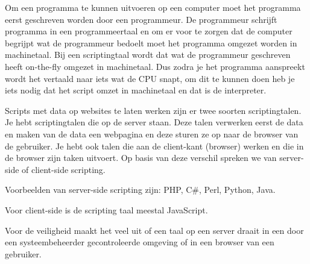 Om een programma te kunnen uitvoeren op een computer moet het programma eerst geschreven worden door een programmeur. De programmeur schrijft programma in een programmeertaal en om er voor te zorgen dat de computer begrijpt wat de programmeur bedoelt moet het programma omgezet worden in machinetaal. Bij een scriptingtaal wordt dat wat de programmeur geschreven heeft on-the-fly omgezet in machinetaal. Dus zodra je het programma aanspreekt wordt het vertaald naar iets wat de CPU snapt, om dit te kunnen doen heb je iets nodig dat het script omzet in machinetaal en dat is de interpreter.

Scripts met data op websites te laten werken zijn er twee soorten scriptingtalen. Je hebt scriptingtalen die op de server staan. Deze talen verwerken eerst de data en maken van de data een webpagina en deze sturen ze op naar de browser van de gebruiker. Je hebt ook talen die aan de client-kant (browser) werken en die in de browser zijn taken uitvoert. Op basis van deze verschil spreken we van server-side of client-side scripting.

Voorbeelden van server-side scripting zijn: PHP, C\#, Perl, Python, Java.

Voor client-side is de scripting taal meestal JavaScript.

Voor de veiligheid maakt het veel uit of een taal op een server draait in een door een systeembeheerder gecontroleerde omgeving of in een browser van een gebruiker.
